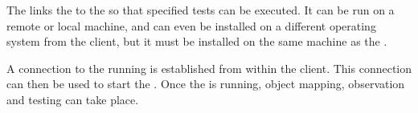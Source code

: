 The \gdserver links the \gdaut to the \gdclient so that specified tests can be 
executed. 
It can be run on a remote or  local machine, and can even be installed on a
different operating system from the client, but it must be installed on the 
same machine as the \gdaut{}. 

A connection to the running \gdserver is established from within the client. 
This connection can then be used to start the \gdaut{}. 
Once the \gdaut is running, object mapping, observation and testing can take 
place. 





